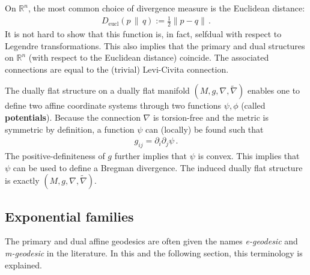     \begin{example}
        On $\mathbb{R}^n$, the most common choice of divergence measure is the Euclidean distance:
        \begin{gather}
            D_{\text{eucl}}(p\,\|\,q) := \frac{1}{2}\|p-q\|\,.
        \end{gather}
        It is not hard to show that this function is, in fact, selfdual with respect to Legendre transformations. This also implies that the primary and dual structures on $\mathbb{R}^n$ (with respect to the Euclidean distance) coincide. The associated connections are equal to the (trivial) Levi-Civita connection.
    \end{example}

    \begin{property}
        The dually flat structure on a dually flat manifold $(M,g,\nabla,\widetilde{\nabla})$ enables one to define two affine coordinate systems through two functions $\psi,\phi$ (called \textbf{potentials}). Because the connection $\nabla$ is torsion-free and the metric is symmetric by definition, a function $\psi$ can (locally) be found such that
        \begin{gather}
            g_{ij} = \partial_i\partial_j\psi\,.
        \end{gather}
        The positive-definiteness of $g$ further implies that $\psi$ is convex. This implies that $\psi$ can be used to define a Bregman divergence. The induced dually flat structure is exactly $(M,g,\nabla,\widetilde{\nabla})$.
    \end{property}

\subsection{Exponential families}

    The primary and dual affine geodesics are often given the names \textit{e-geodesic} and \textit{m-geodesic} in the literature. In this and the following section, this terminology is explained.

